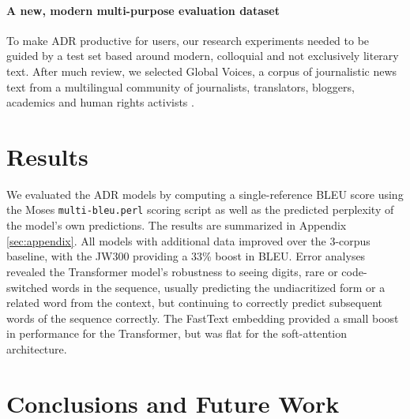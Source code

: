 \documentclass{article} %
\begin{document}
\paragraph{A new, modern multi-purpose evaluation dataset}\label{sec:evaldataset} To make ADR productive for users, our research experiments needed to be guided by a test set based around modern, colloquial and not exclusively literary text. After much review, we selected Global Voices, a corpus of journalistic news text %
from a multilingual community of journalists, translators, bloggers, academics and human rights activists \citep{global_voices}.



\section{Results}\label{sec:results}
We evaluated the ADR models by computing a single-reference BLEU score using the Moses \texttt{multi-bleu.perl} scoring script as well as the predicted perplexity of the model's own predictions. The results are summarized in Appendix \ref{sec:appendix}. All models with additional data improved over the 3-corpus baseline, with the JW300 providing a 33\% boost in BLEU. Error analyses revealed the Transformer model's robustness to seeing digits, rare or code-switched words in the sequence, usually predicting the undiacritized form or a related word from the context, but continuing to correctly predict subsequent words of the sequence correctly. The FastText embedding provided a small boost in performance for the Transformer, but was flat for the soft-attention architecture. 
  
\section{Conclusions and Future Work}
\end{document}

